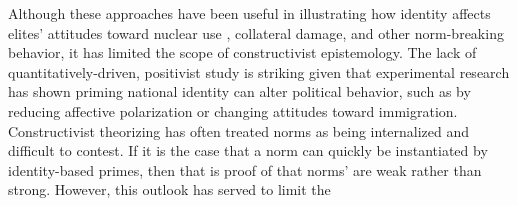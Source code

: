 

Although these approaches have been useful in illustrating how identity affects elites' attitudes toward nuclear use \citep{tannenwald_nuclear_2007}, collateral damage, and other norm-breaking behavior, it has limited the scope of constructivist epistemology. The lack of quantitatively-driven, positivist study is striking given that experimental research has shown priming national identity can alter political behavior, such as by reducing affective polarization or changing attitudes toward immigration. Constructivist theorizing has often treated norms as being  internalized and difficult to contest. If it is the case that a norm can quickly be instantiated by identity-based primes, then that is proof of that norms' are weak rather than strong.  However, this outlook has served to limit the 